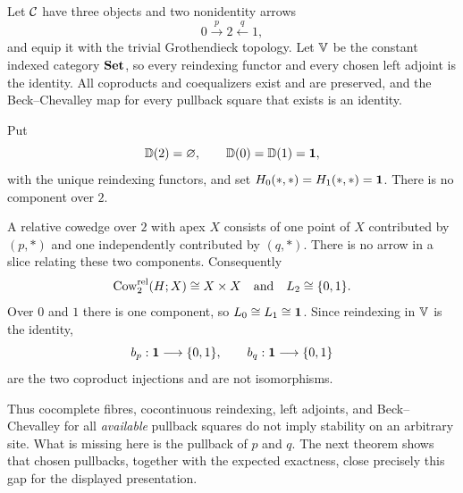 \begin{example}
\label{ex:missing-pullback}
Let \(\mathcal{C}\) have three objects and two nonidentity arrows
\[
  0\xrightarrow{p}2\xleftarrow{q}1,
\]
and equip it with the trivial Grothendieck topology.  Let \(\mathbb{V}\) be the
constant indexed category \(\mathbf{Set}\), so every reindexing functor and every
chosen left adjoint is the identity.  All coproducts and coequalizers exist
and are preserved, and the Beck--Chevalley map for every pullback square that
exists is an identity.

Put
\[
  \mathbb{D}(2)=\varnothing,
  \qquad
  \mathbb{D}(0)=\mathbb{D}(1)=\mathbf{1},
\]
with the unique reindexing functors, and set
\(H_0(*,*)=H_1(*,*)=\mathbf{1}\).  There is no component over \(2\).

A relative cowedge over \(2\) with apex \(X\) consists of one point of
\(X\) contributed by \((p,*)\) and one independently contributed by
\((q,*)\).  There is no arrow in a slice relating these two components.
Consequently
\[
  \operatorname{Cow}^{\mathrm{rel}}_2(H;X)\cong X\times X
  \quad\text{and}\quad
  L_2\cong\{0,1\}.
\]
Over \(0\) and \(1\) there is one component, so
\(L_0\cong L_1\cong\mathbf{1}\).  Since reindexing in \(\mathbb{V}\) is the identity,
\[
  b_p:\mathbf{1}\longrightarrow\{0,1\},
  \qquad
  b_q:\mathbf{1}\longrightarrow\{0,1\}
\]
are the two coproduct injections and are not isomorphisms.

Thus cocomplete fibres, cocontinuous reindexing, left adjoints, and
Beck--Chevalley for all \emph{available} pullback squares do not imply
stability on an arbitrary site.  What is missing here is the pullback of
\(p\) and \(q\).  The next theorem shows that chosen pullbacks, together with
the expected exactness, close precisely this gap for the displayed
presentation.
\end{example}

